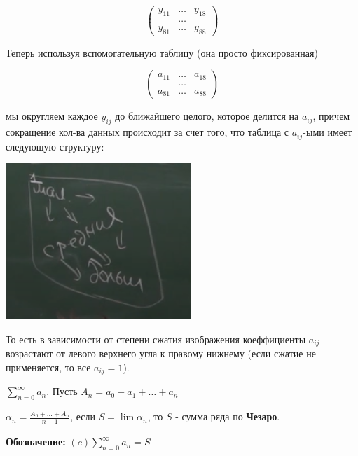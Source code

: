 \begin{remark}
    $$\begin{pmatrix}
    y_{11} & \ldots & y_{18} \\
    & \ldots \\
    y_{81} & \ldots & y_{88}
    \end{pmatrix}$$

    Теперь используя вспомогательную таблицу (она просто фиксированная)
    
    $$\begin{pmatrix}
    a_{11} & \ldots & a_{18} \\
    & \ldots \\
    a_{81} & \ldots & a_{88}
    \end{pmatrix}$$

    мы округляем каждое $y_{ij}$ до ближайшего целого, которое делится на $a_{ij}$, причем сокращение кол-ва данных происходит за счет того, что таблица с $a_{ij}$-ыми имеет следующую структуру:

    \begin{center}
        \includegraphics[width=7cm]{assets/05-fourierreihe/aij.png}
    \end{center}

    То есть в зависимости от степени сжатия изображения коеффициенты $a_{ij}$ возрастают от левого верхнего угла к правому нижнему (если сжатие не применяется, то все $a_{ij} = 1$).
\end{remark}


\begin{definition}
    $\sum\limits_{n = 0}^\infty a_n$. Пусть $A_n = a_0 + a_1 + \ldots + a_n$

    $\alpha_n = \frac{A_0 + \ldots + A_n}{n+1}$, если $S = \lim \alpha_n$, то $S$ - сумма ряда по \textbf{Чезаро}.

    \textbf{Обозначение: } $(c) \sum\limits_{n = 0}^\infty a_n = S$
\end{definition}

